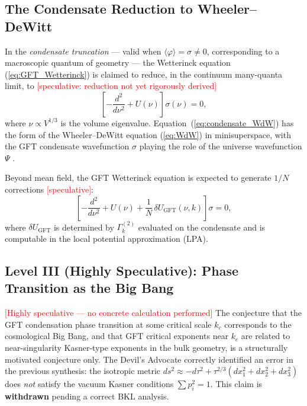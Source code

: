 \documentclass[11pt,a4paper]{article}
\begin{document}
\subsection{The Condensate Reduction to Wheeler--DeWitt}
\label{sec:condensate}

In the \emph{condensate truncation} --- valid when $\langle\varphi\rangle = \sigma \neq 0$,
corresponding to a macroscopic quantum of geometry --- the Wetterinck equation
(\ref{eq:GFT_Wetterinck}) is claimed to reduce, in the continuum many-quanta limit,
to \textcolor{red}{[speculative: reduction not yet rigorously derived]}
\begin{equation}
  \left[-\frac{d^{2}}{d\nu^{2}} + U(\nu)\right]\sigma(\nu) = 0,
  \label{eq:condensate_WdW}
\end{equation}
where $\nu \propto V^{1/3}$ is the volume eigenvalue.
Equation~(\ref{eq:condensate_WdW}) has the form of the Wheeler--DeWitt equation
(\ref{eq:WdW}) in minisuperspace, with the GFT condensate wavefunction $\sigma$ playing
the role of the universe wavefunction $\Psi$ \cite{ashtekar2004,thiemann1996}.

Beyond mean field, the GFT Wetterinck equation is expected to generate $1/N$
corrections \textcolor{red}{[speculative]}:
\begin{equation}
  \left[-\frac{d^{2}}{d\nu^{2}} + U(\nu)
        + \frac{1}{N}\,\delta U_{\mathrm{GFT}}(\nu,k)\right]\sigma = 0,
  \label{eq:1overN_correction}
\end{equation}
where $\delta U_{\mathrm{GFT}}$ is determined by $\Gamma_{k}^{(2)}$ evaluated on the
condensate and is computable in the local potential approximation (LPA).

\subsection{Level III (Highly Speculative): Phase Transition as the Big Bang}
\label{sec:levelIII}

\textcolor{red}{[Highly speculative --- no concrete calculation performed]}
The conjecture that the GFT condensation phase transition at some critical scale $k_{c}$
corresponds to the cosmological Big Bang, and that GFT critical exponents near $k_{c}$
are related to near-singularity Kasner-type exponents in the bulk geometry, is a
structurally motivated conjecture only.
The Devil's Advocate correctly identified an error in the previous synthesis: the isotropic
metric $ds^{2}\approx -d\tau^{2}+\tau^{2/3}(dx_{1}^{2}+dx_{2}^{2}+dx_{3}^{2})$ does
\emph{not} satisfy the vacuum Kasner conditions $\sum p_{i}^{2}=1$.
This claim is \textbf{withdrawn} pending a correct BKL analysis.
\end{document}
